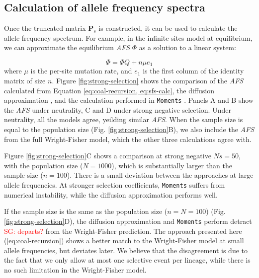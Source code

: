 \documentclass[review]{elsarticle}
\newcommand{\sgcomment}[1]{\textcolor{red}{SG: #1}}
\begin{document}
\subsection{Calculation of allele frequency spectra}
\label{subsec:afs}

Once the truncated matrix $\mathbf{P}_s$ is constructed, it can be used to calculate the allele
frequency spectrum. For example, in the infinite sites model at equilibrium, we can approximate the equilibrium
\textit{AFS} $\Phi$ as a solution to a linear system:

\begin{equation}
  \label{eq:sfs-calc}
  \Phi = \Phi Q + n \mu e_1
\end{equation}
where $\mu$ is the per-site mutation rate, and $e_1$ is the first column of the identity matrix of
size $n$. Figure \ref{fig:strong-selection} shows the comparison of the \textit{AFS} calculated from
Equation \eqref{eq:coal-recursion, eq:sfs-calc}, the diffusion approximation \cite[eq.
9.23]{Ewens2004}, and the calculation performed in \texttt{Moments} \citep{JouganousEtAl2017}.
Panels A and B show the \textit{AFS} under neutrality, C and D under strong negative selection.
Under neutrality, all the models agree, yeilding similar \textit{AFS}. When the sample size is equal
to the population size (Fig. \ref{fig:strong-selection}B), we also include the \textit{AFS} from the
full Wright-Fisher model, which the other three calculations agree with.

Figure \ref{fig:strong-selection}C shows a comparison at strong negative $Ns=50$, with the population
size ($N=1000$), which is substantially larger than the sample size ($n=100$). There is a small
deviation between the approaches at large allele frequencies. At stronger selection coefficients,
\texttt{Moments} suffers from numerical instability, while the diffusion approximation performs
well.

If the sample size is the same as the population size ($n=N=100$) (Fig.
\ref{fig:strong-selection}D), the diffusion approximation and \texttt{Moments} perform detract \sgcomment{departs?} from
the Wright-Fisher prediction. The approach presented here (\ref{eq:coal-recursion}) shows a better
match to the Wright-Fisher model at small allele frequencies, but deviates later. We believe that
the disagreement is due to the fact that we only allow at most one selective event per lineage,
while there is no such limitation in the Wright-Fisher model.
\end{document}
